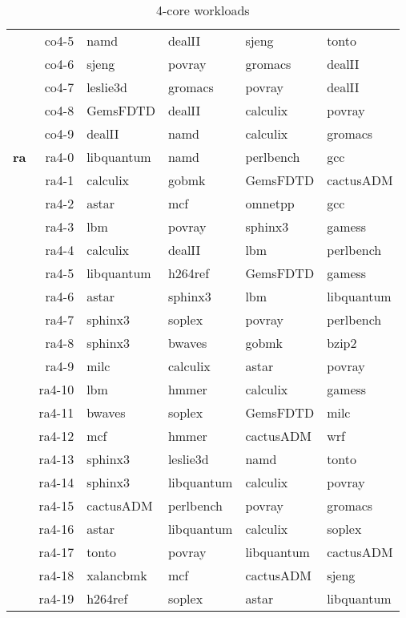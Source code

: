 \begin{table}[ht]
{\begin{tabular}{|r|r|llll|}
			 & co4-5	 & namd & dealII & sjeng & tonto \\ 
			 & co4-6	 & sjeng & povray & gromacs & dealII \\ 
			 & co4-7	 & leslie3d & gromacs & povray & dealII \\ 
			 & co4-8	 & GemsFDTD & dealII & calculix & povray \\ 
			 & co4-9	 & dealII & namd & calculix & gromacs \\ 
\textbf{ra}	 & ra4-0	 & libquantum & namd & perlbench & gcc \\ 
			 & ra4-1	 & calculix & gobmk & GemsFDTD & cactusADM \\ 
			 & ra4-2	 & astar & mcf & omnetpp & gcc \\ 
			 & ra4-3	 & lbm & povray & sphinx3 & gamess \\ 
			 & ra4-4	 & calculix & dealII & lbm & perlbench \\ 
			 & ra4-5	 & libquantum & h264ref & GemsFDTD & gamess \\ 
			 & ra4-6	 & astar & sphinx3 & lbm & libquantum \\ 
			 & ra4-7	 & sphinx3 & soplex & povray & perlbench \\ 
			 & ra4-8	 & sphinx3 & bwaves & gobmk & bzip2 \\ 
			 & ra4-9	 & milc & calculix & astar & povray \\ 
			 & ra4-10	 & lbm & hmmer & calculix & gamess \\ 
			 & ra4-11	 & bwaves & soplex & GemsFDTD & milc \\ 
			 & ra4-12	 & mcf & hmmer & cactusADM & wrf \\ 
			 & ra4-13	 & sphinx3 & leslie3d & namd & tonto \\ 
			 & ra4-14	 & sphinx3 & libquantum & calculix & povray \\ 
			 & ra4-15	 & cactusADM & perlbench & povray & gromacs \\ 
			 & ra4-16	 & astar & libquantum & calculix & soplex \\ 
			 & ra4-17	 & tonto & povray & libquantum & cactusADM \\ 
			 & ra4-18	 & xalancbmk & mcf & cactusADM & sjeng \\ 
			 & ra4-19	 & h264ref & soplex & astar & libquantum \\ 
\hline
\end{tabular}%
} 
\caption{4-core workloads}
\label{tbl:benchmark_workloads:4-workloads}
\end{table}
